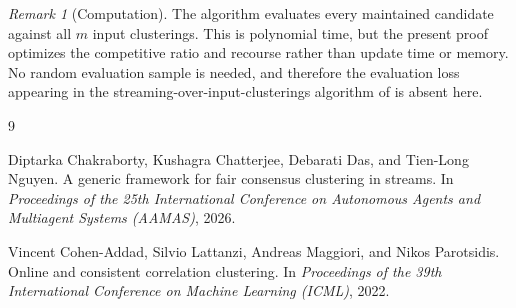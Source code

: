 \documentclass[11pt]{article}
\theoremstyle{definition}
\theoremstyle{remark}
\newtheorem{remark}[theorem]{Remark}
\newcommand{\1}{\mathbf 1}
\begin{document}
\begin{remark}[Computation]
The algorithm evaluates every maintained candidate against all $m$ input
clusterings.  This is polynomial time, but the present proof optimizes the
competitive ratio and recourse rather than update time or memory.  No random
evaluation sample is needed, and therefore the evaluation loss appearing in
the streaming-over-input-clusterings algorithm of
\cite{ChakrabortyEtAl2026} is absent here.
\end{remark}

\begin{thebibliography}{9}

Diptarka Chakraborty, Kushagra Chatterjee, Debarati Das, and
Tien-Long Nguyen.
\newblock A generic framework for fair consensus clustering in streams.
\newblock In \emph{Proceedings of the 25th International Conference on
Autonomous Agents and Multiagent Systems (AAMAS)}, 2026.

Vincent Cohen-Addad, Silvio Lattanzi, Andreas Maggiori, and Nikos Parotsidis.
\newblock Online and consistent correlation clustering.
\newblock In \emph{Proceedings of the 39th International Conference on
Machine Learning (ICML)}, 2022.

\end{thebibliography}
\end{document}
